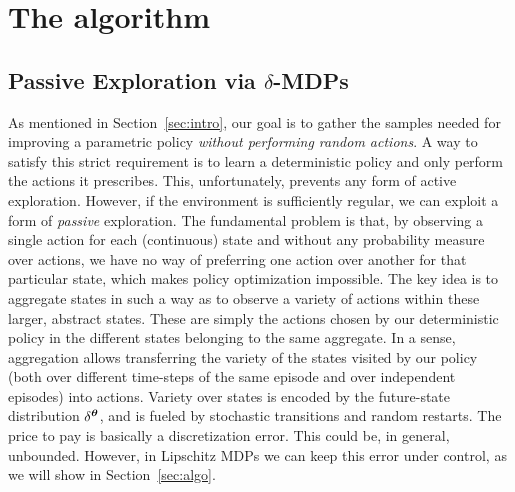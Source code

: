 \chapter{The algorithm}

\section{Passive Exploration via $\delta$-MDPs}\label{sec:deltamdp}
As mentioned in Section~\ref{sec:intro}, our goal is to gather the samples needed for improving a parametric policy \emph{without performing random actions}. A way to satisfy this strict requirement is to learn a deterministic policy and only perform the actions it prescribes. 
This, unfortunately, prevents any form of active exploration. 
However, if the environment is sufficiently regular, we can exploit a form of \emph{passive} exploration. The fundamental problem is that, by observing a single action for each (continuous) state and without any probability measure over actions, we have no way of preferring one action over another for that particular state, which makes policy optimization impossible.  
The key idea is to aggregate states in such a way as to observe a variety of actions within these larger, abstract states. These are simply the actions chosen by our deterministic policy in the different states belonging to the same aggregate. In a sense, aggregation allows transferring the variety of the states visited by our policy (both over different time-steps of the same episode and over independent episodes) into actions. Variety over states is encoded by the future-state distribution $\delta^{\boldsymbol{\theta}}$, and is fueled by stochastic transitions and random restarts.
The price to pay is basically a discretization error. This could be, in general, unbounded. However, in Lipschitz MDPs we can keep this error under control, as we will show in Section~\ref{sec:algo}.
%
